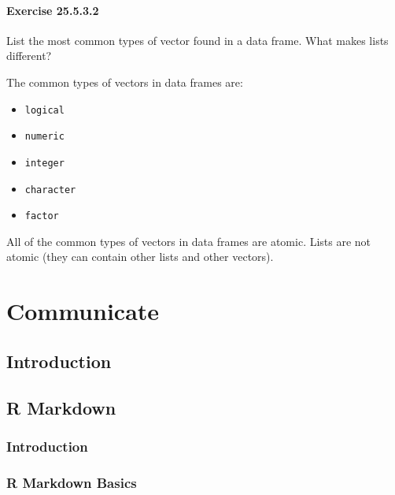\documentclass[]{book}
\providecommand{\tightlist}{%
  \setlength{\itemsep}{0pt}\setlength{\parskip}{0pt}}
\theoremstyle{plain}
\theoremstyle{remark}
\begin{document}
\hypertarget{exercise-25.5.3.2}{%
\subsection*{\texorpdfstring{Exercise {25.5.3.2}}{Exercise 25.5.3.2}}\label{exercise-25.5.3.2}}

List the most common types of vector found in a data frame.
What makes lists different?

The common types of vectors in data frames are:

\begin{itemize}
\tightlist
\item
  \texttt{logical}
\item
  \texttt{numeric}
\item
  \texttt{integer}
\item
  \texttt{character}
\item
  \texttt{factor}
\end{itemize}

All of the common types of vectors in data frames are atomic. Lists are not atomic (they can contain other lists and other vectors).

\hypertarget{part-communicate}{%
\part{Communicate}\label{part-communicate}}

\hypertarget{communicate-intro}{%
\chapter{Introduction}\label{communicate-intro}}

\hypertarget{r-markdown}{%
\chapter{R Markdown}\label{r-markdown}}

\hypertarget{introduction-17}{%
\section{Introduction}\label{introduction-17}}

\hypertarget{r-markdown-basics}{%
\section{R Markdown Basics}\label{r-markdown-basics}}
\end{document}
